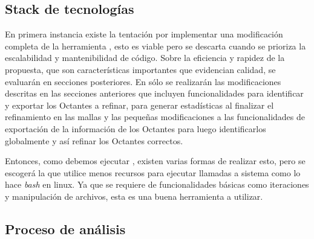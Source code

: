 \subsection{Stack de tecnologías}

En primera instancia existe la tentación por implementar una modificación completa de la herramienta \mesher{}, esto es viable pero se descarta cuando se prioriza la escalabilidad y mantenibilidad de código. Sobre la eficiencia y rapidez de la propuesta, que son características importantes que evidencian calidad, se evaluarán en secciones posteriores.
En \mesher{} sólo se realizarán las modificaciones descritas en las secciones anteriores que incluyen funcionalidades para identificar y exportar los Octantes a refinar, para generar estadísticas al finalizar el refinamiento en las mallas y las pequeñas modificaciones a las funcionalidades de exportación de la información de los Octantes para luego identificarlos globalmente y así refinar los Octantes correctos.

Entonces, como debemos ejecutar \mesher{}, existen varias formas de realizar esto, pero se escogerá la que utilice menos recursos para ejecutar llamadas a sistema como lo hace \textit{bash} en linux. Ya que se requiere de funcionalidades básicas como iteraciones y manipulación de archivos, esta es una buena herramienta a utilizar.

\subsection{Proceso de análisis}

